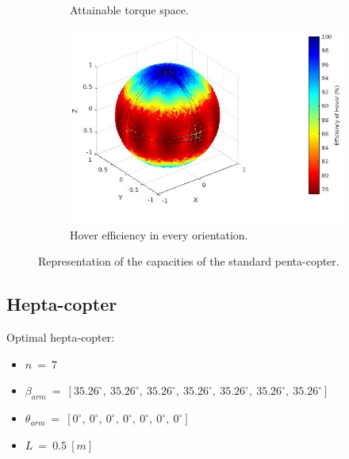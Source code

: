 \begin{figure}[!h]
{\begin{subfigure}[b]{0.5\textwidth}
    \caption{Attainable torque space.} \label{fig:penta_standard_tspace}
  \end{subfigure}
  \begin{subfigure}[b]{0.45\textwidth}
    \includegraphics[width=\linewidth]{images/Penta_standard_hspace.jpg}
    \caption{Hover efficiency in every orientation.} \label{fig:penta_standard_hspace}
  \end{subfigure}}
  \caption{Representation of the capacities of the standard penta-copter.}
  \label{fig:penta_standard_spaces}
\end{figure}

\subsection{Hepta-copter}
\label{sec:hepta_copter}
Optimal hepta-copter:
\begin{itemize}
  \item $n\ =\ 7$
  \item $\beta_{arm}\ =\ [35.26^{\circ},\  35.26^{\circ},\  35.26^{\circ},\  35.26^{\circ},\
                          35.26^{\circ},\  35.26^{\circ},\  35.26^{\circ}]$
  \item $\theta_{arm}\ =\ [0^{\circ},\  0^{\circ},\  0^{\circ},\  0^{\circ},\  0^{\circ},\
                            0^{\circ},\  0^{\circ}]$
  \item $L\ =\ 0.5\ [m]$
\end{itemize}

